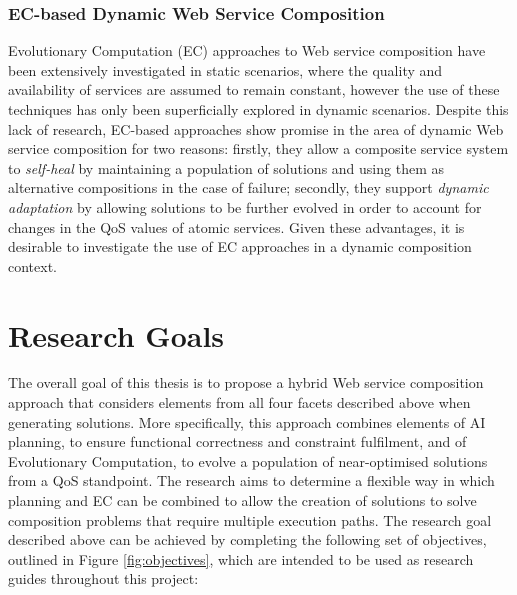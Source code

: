 \subsubsection{EC-based Dynamic Web Service Composition}
Evolutionary Computation (EC) approaches to Web service composition have been extensively investigated in static scenarios, where the quality and availability of services are assumed to remain constant, however the use of these techniques has only been superficially explored in dynamic scenarios. Despite this lack of research, EC-based approaches show promise in the area of dynamic Web service composition for two reasons: firstly, they allow a composite service system to \textit{self-heal} by maintaining a population of solutions and using them as alternative compositions in the case of failure; secondly, they support \textit{dynamic adaptation} by allowing solutions to be further evolved in order to account for changes in the QoS values of atomic services. Given these advantages, it is desirable to investigate the use of EC approaches in a dynamic composition context.

\section{Research Goals}
The overall goal of this thesis is to propose a hybrid  Web service composition approach that considers elements from all four facets described above when generating solutions. More specifically, this approach combines elements of AI planning, to ensure functional correctness and constraint fulfilment, and of Evolutionary Computation, to evolve a population of near-optimised solutions from a QoS standpoint. The research aims to determine a flexible way in which planning and EC can be combined to allow the creation of solutions to solve composition problems that require multiple execution paths. The research goal described above can be achieved by completing the following set of objectives, outlined in Figure \ref{fig:objectives}, which are intended to be used as research guides throughout this project:

